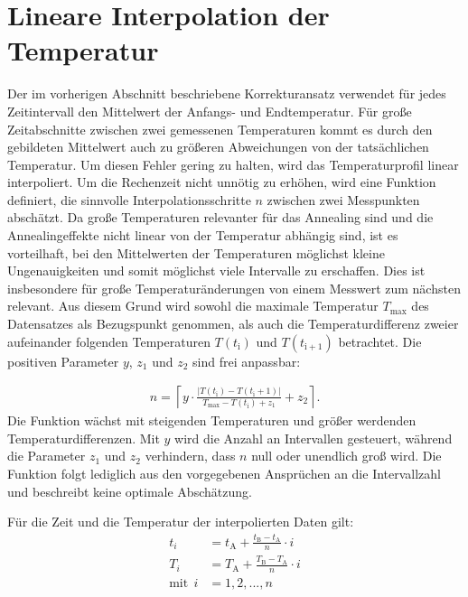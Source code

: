 \section{Lineare Interpolation der Temperatur}
Der im vorherigen Abschnitt beschriebene Korrekturansatz verwendet für jedes
Zeitintervall den Mittelwert der Anfangs- und Endtemperatur. Für große
Zeitabschnitte zwischen zwei gemessenen Temperaturen kommt es durch den gebildeten Mittelwert auch zu größeren Abweichungen von der tatsächlichen
Temperatur. Um diesen Fehler gering zu halten, wird das Temperaturprofil
linear interpoliert.
Um die Rechenzeit nicht unnötig zu erhöhen, wird eine Funktion definiert, die sinnvolle
Interpolationsschritte $n$ zwischen zwei Messpunkten abschätzt.
Da große Temperaturen relevanter für das Annealing sind und die Annealingeffekte nicht linear von
der Temperatur abhängig sind, ist es vorteilhaft,
bei den Mittelwerten der Temperaturen möglichst kleine Ungenauigkeiten und somit möglichst viele
Intervalle zu erschaffen. Dies ist insbesondere für große Temperaturänderungen von einem Messwert zum nächsten relevant.
Aus diesem Grund wird sowohl die maximale Temperatur $T_{\mathrm{max}}$ des Datensatzes
als Bezugspunkt genommen, als auch die Temperaturdifferenz zweier
aufeinander folgenden Temperaturen $T(t_{\mathrm{i}})$ und $T(t_{\mathrm{i+1}})$  betrachtet. Die positiven Parameter $y$, $z_1$
und $z_2$ sind frei anpassbar:

\begin{align*}
  n = \left\lceil{ y \cdot \frac{|T(t_{\mathrm{i}})-T(t_{\mathrm{i}}+1)|}{T_{\mathrm{max}}-T(t_{\mathrm{i}})+ z_1}}+z_2 \right\rceil \label{eqn:intervall} .
\end{align*}
Die Funktion wächst mit steigenden Temperaturen und größer werdenden Temperaturdifferenzen.
Mit $y$ wird die Anzahl an Intervallen gesteuert, während die
Parameter $z_1$ und $z_2$ verhindern, dass $n$ null oder unendlich groß wird.
Die Funktion folgt lediglich aus den vorgegebenen Ansprüchen an die Intervallzahl und beschreibt
keine optimale Abschätzung.


Für die Zeit und die Temperatur der interpolierten Daten gilt:
\begin{align}
  t_i &= t_{\mathrm{A}} +  \frac{t_{\mathrm{B}}-t_{\mathrm{A}}}{n} \cdot i \\
  T_i &= T_{\mathrm{A}} +  \frac{T_{\mathrm{B}}-T_{\mathrm{A}}}{n} \cdot i \\
  \text{mit}\:\:i &= 1, 2, ..., n
\end{align}

